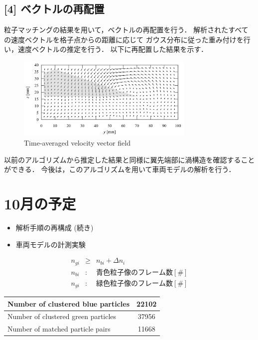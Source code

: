 \documentclass[twocolumn,a4j]{jsarticle}
\begin{document}
\subsection{[4] ベクトルの再配置}
粒子マッチングの結果を用いて，ベクトルの再配置を行う．
解析されたすべての速度ベクトルを格子点からの距離に応じて
ガウス分布に従った重み付けを行い，速度ベクトルの推定を行う．
以下に再配置した結果を示す．

\begin{figure}[htbp]
	\includegraphics[keepaspectratio, width=85mm]{../images/time-averaged_velocity.png}
	\caption{Time-averaged velocity vector field}
\end{figure}

以前のアルゴリズムから推定した結果と同様に翼先端部に渦構造を確認することができる．
今後は，このアルゴリズムを用いて車両モデルの解析を行う．

\section{10月の予定}
\begin{itemize}
	\item 解析手順の再構成 (続き)
	\item 車両モデルの計測実験
\end{itemize}

\newpage
\begin{eqnarray*}
	n_{gi} &\geq& n_{bi} + \Delta n_i\\
	n_{bi} &:& 青色粒子像のフレーム数 [\#]\\
	n_{gi} &:& 緑色粒子像のフレーム数 [\#]
\end{eqnarray*}

\begin{table}[hbtp]
	\centering
	\begin{tabular}{l c}
		\hline
		Number of clustered blue particles  & 22102 \\ \hline
		Number of clustered green particles & 37956 \\ \hline
		Number of matched particle pairs    & 11668 \\ \hline
	\end{tabular}
\end{table}
\end{document}
